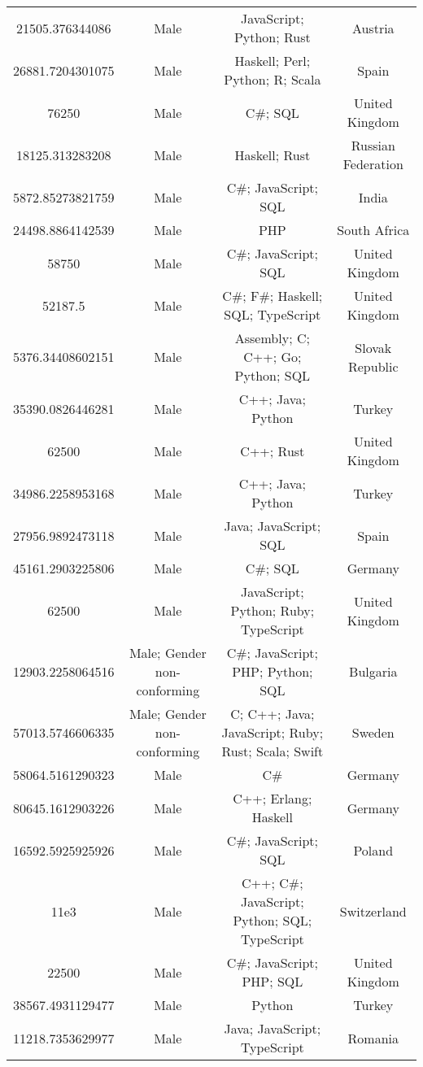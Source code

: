 \begin{center}
\begin{tabular}{ |c|c|c|c| }
21505.376344086  &  Male  &  JavaScript; Python; Rust  &  Austria  \\ 
26881.7204301075  &  Male  &  Haskell; Perl; Python; R; Scala  &  Spain  \\ 
76250  &  Male  &  C\#; SQL  &  United Kingdom  \\ 
18125.313283208  &  Male  &  Haskell; Rust  &  Russian Federation  \\ 
5872.85273821759  &  Male  &  C\#; JavaScript; SQL  &  India  \\ 
24498.8864142539  &  Male  &  PHP  &  South Africa  \\ 
58750  &  Male  &  C\#; JavaScript; SQL  &  United Kingdom  \\ 
52187.5  &  Male  &  C\#; F\#; Haskell; SQL; TypeScript  &  United Kingdom  \\ 
5376.34408602151  &  Male  &  Assembly; C; C++; Go; Python; SQL  &  Slovak Republic  \\ 
35390.0826446281  &  Male  &  C++; Java; Python  &  Turkey  \\ 
62500  &  Male  &  C++; Rust  &  United Kingdom  \\ 
34986.2258953168  &  Male  &  C++; Java; Python  &  Turkey  \\ 
27956.9892473118  &  Male  &  Java; JavaScript; SQL  &  Spain  \\ 
45161.2903225806  &  Male  &  C\#; SQL  &  Germany  \\ 
62500  &  Male  &  JavaScript; Python; Ruby; TypeScript  &  United Kingdom  \\ 
12903.2258064516  &  Male; Gender non-conforming  &  C\#; JavaScript; PHP; Python; SQL  &  Bulgaria  \\ 
57013.5746606335  &  Male; Gender non-conforming  &  C; C++; Java; JavaScript; Ruby; Rust; Scala; Swift  &  Sweden  \\ 
58064.5161290323  &  Male  &  C\#  &  Germany  \\ 
80645.1612903226  &  Male  &  C++; Erlang; Haskell  &  Germany  \\ 
16592.5925925926  &  Male  &  C\#; JavaScript; SQL  &  Poland  \\ 
11e3  &  Male  &  C++; C\#; JavaScript; Python; SQL; TypeScript  &  Switzerland  \\ 
22500  &  Male  &  C\#; JavaScript; PHP; SQL  &  United Kingdom  \\ 
38567.4931129477  &  Male  &  Python  &  Turkey  \\ 
11218.7353629977  &  Male  &  Java; JavaScript; TypeScript  &  Romania  \\ 

\end{tabular}
\end{center}
